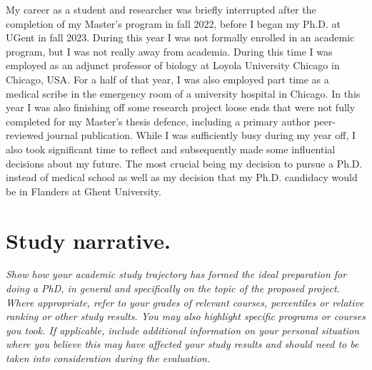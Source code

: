 {My career as a student and researcher was briefly interrupted after the completion of my Master's program in fall 2022, before I began my Ph.D. at UGent in fall 2023. 
During this year I was not formally enrolled in an academic program, but I was not really away from academia. 
During this time I was employed as an adjunct professor of biology at Loyola University Chicago in Chicago, USA.
For a half of that year, I was also employed part time as a medical scribe in the emergency room of a university hospital in Chicago.
In this year I was also finishing off some research project loose ends that were not fully completed for my Master's thesis defence, including a primary author peer-reviewed journal publication.
While I was sufficiently busy during my year off, I also took significant time to reflect and subsequently made some influential decisions about my future.
The most crucial being my decision to pursue a Ph.D. instead of medical school as well as my decision that my Ph.D. candidacy would be in Flanders at Ghent University.


\section{Study narrative.}
\textit{
Show how your academic study trajectory has formed the ideal preparation for doing a PhD, in general and specifically on the topic of the proposed project. 
Where appropriate, refer to your grades of relevant courses, percentiles or relative ranking or other study results. 
You may also highlight specific programs or courses you took. 
If applicable, include additional information on your personal situation where you believe this may have affected your study results and should need to be taken into consideration during the evaluation.
}

}

